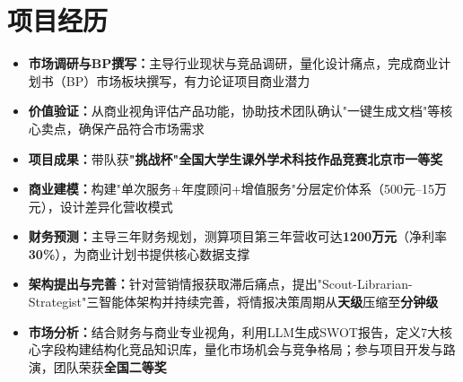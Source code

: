 \documentclass{resume}
\begin{document}
\section{项目经历}
\begin{itemize}[parsep=0.05ex]
  \item \textbf{市场调研与BP撰写：}主导行业现状与竞品调研，量化设计痛点，完成商业计划书（BP）市场板块撰写，有力论证项目商业潜力
  \item \textbf{价值验证：}从商业视角评估产品功能，协助技术团队确认"一键生成文档"等核心卖点，确保产品符合市场需求
  \item \textbf{项目成果：}带队获\textbf{"挑战杯"全国大学生课外学术科技作品竞赛北京市一等奖}
\end{itemize}
\begin{itemize}[parsep=0.05ex]
  \item \textbf{商业建模：}构建"单次服务+年度顾问+增值服务"分层定价体系（500元--15万元），设计差异化营收模式
  \item \textbf{财务预测：}主导三年财务规划，测算项目第三年营收可达\textbf{1200万元}（净利率\textbf{30\%}），为商业计划书提供核心数据支撑
\end{itemize}
\begin{itemize}[parsep=0.05ex]
  \item \textbf{架构提出与完善：}针对营销情报获取滞后痛点，提出"Scout-Librarian-Strategist"三智能体架构并持续完善，将情报决策周期从\textbf{天级}压缩至\textbf{分钟级}
  \item \textbf{市场分析：}结合财务与商业专业视角，利用LLM生成SWOT报告，定义7大核心字段构建结构化竞品知识库，量化市场机会与竞争格局；参与项目开发与路演，团队荣获\textbf{全国二等奖}
\end{itemize}
\end{document}
